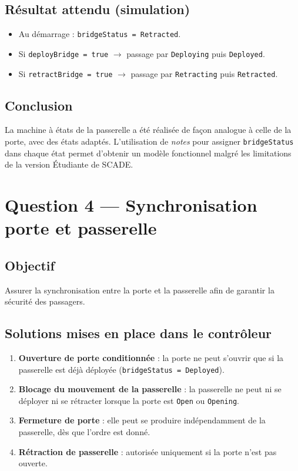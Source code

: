 \documentclass[11pt,a4paper]{report}
\begin{document}
\section*{Résultat attendu (simulation)}
\begin{itemize}
  \item Au démarrage : \texttt{bridgeStatus = Retracted}.
  \item Si \texttt{deployBridge = true} $\rightarrow$ passage par \texttt{Deploying} puis \texttt{Deployed}.
  \item Si \texttt{retractBridge = true} $\rightarrow$ passage par \texttt{Retracting} puis \texttt{Retracted}.
\end{itemize}

\section*{Conclusion}
La machine à états de la passerelle a été réalisée de façon analogue à celle de la porte, avec des états adaptés.  
L’utilisation de \textit{notes} pour assigner \texttt{bridgeStatus} dans chaque état permet d’obtenir un modèle fonctionnel malgré les limitations de la version Étudiante de SCADE.


\chapter{Question 4 — Synchronisation porte et passerelle}

\section*{Objectif}
Assurer la synchronisation entre la porte et la passerelle afin de garantir la sécurité des passagers.

\section*{Solutions mises en place dans le contrôleur}
\begin{enumerate}
  \item \textbf{Ouverture de porte conditionnée} : la porte ne peut s’ouvrir que si la passerelle est déjà déployée (\texttt{bridgeStatus = Deployed}).
  \item \textbf{Blocage du mouvement de la passerelle} : la passerelle ne peut ni se déployer ni se rétracter lorsque la porte est \texttt{Open} ou \texttt{Opening}.
  \item \textbf{Fermeture de porte} : elle peut se produire indépendamment de la passerelle, dès que l’ordre est donné.
  \item \textbf{Rétraction de passerelle} : autorisée uniquement si la porte n’est pas ouverte.
\end{enumerate}
\end{document}
